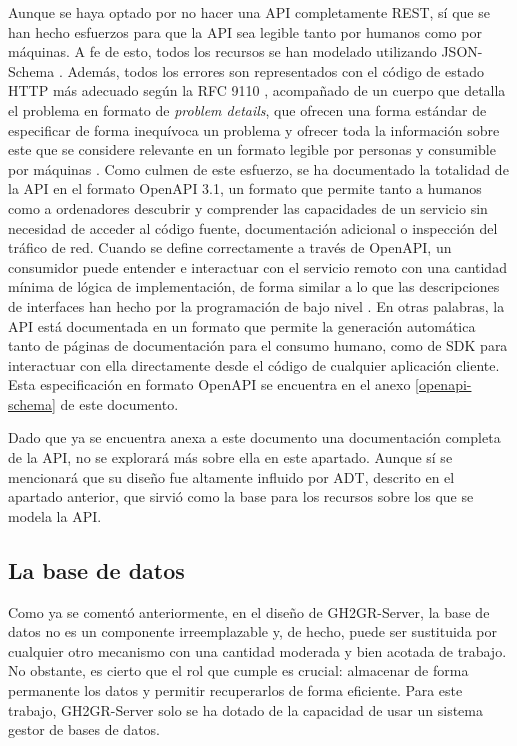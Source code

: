 Aunque se haya optado por no hacer una \acrshort{API} completamente \acrshort{REST}, sí que se han hecho esfuerzos para que la \acrshort{API} sea legible tanto por humanos como por máquinas. A fe de esto, todos los recursos se han modelado utilizando JSON-Schema \cite{jsonschemaJSONSchema}. Además, todos los errores son representados con el código de estado \acrshort{HTTP} más adecuado según la RFC 9110 \cite{rfc9110}, acompañado de un cuerpo que detalla el problema en formato de \textit{problem details}, que ofrecen una forma estándar de especificar de forma inequívoca un problema y ofrecer toda la información sobre este que se considere relevante en un formato legible por personas y consumible por máquinas \cite{rfc9457}. Como culmen de este esfuerzo, se ha documentado la totalidad de la \acrshort{API} en el formato OpenAPI 3.1, un formato que permite tanto a humanos como a ordenadores descubrir y comprender las capacidades de un servicio sin necesidad de acceder al código fuente, documentación adicional o inspección del tráfico de red. Cuando se define correctamente a través de OpenAPI, un consumidor puede entender e interactuar con el servicio remoto con una cantidad mínima de lógica de implementación, de forma similar a lo que las descripciones de interfaces han hecho por la programación de bajo nivel \cite{openapisOpenAPISpecification}. En otras palabras, la \acrshort{API} está documentada en un formato que permite la generación automática tanto de páginas de documentación para el consumo humano, como de \acrshort{SDK} para interactuar con ella directamente desde el código de cualquier aplicación cliente. Esta especificación en formato OpenAPI se encuentra en el anexo \ref{openapi-schema} de este documento.

Dado que ya se encuentra anexa a este documento una documentación completa de la \acrshort{API}, no se explorará más sobre ella en este apartado. Aunque sí se mencionará que su diseño fue altamente influido por \acrshort{ADT}, descrito en el apartado anterior, que sirvió como la base para los recursos sobre los que se modela la \acrshort{API}.
\subsection{La base de datos}
Como ya se comentó anteriormente, en el diseño de GH2GR-Server, la base de datos no es un componente irreemplazable y, de hecho, puede ser sustituida por cualquier otro mecanismo con una cantidad moderada y bien acotada de trabajo. No obstante, es cierto que el rol que cumple es crucial: almacenar de forma permanente los datos y permitir recuperarlos de forma eficiente. Para este trabajo, GH2GR-Server solo se ha dotado de la capacidad de usar un sistema gestor de bases de datos.

